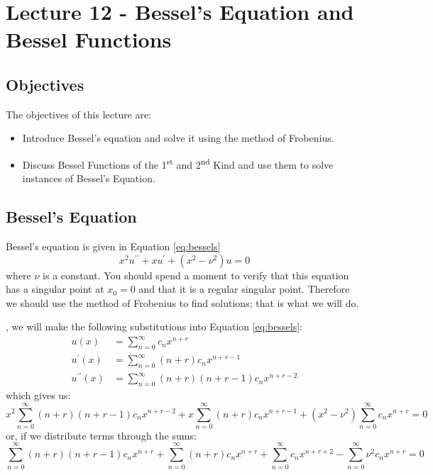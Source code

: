 \chapter{Lecture 12 - Bessel's Equation and Bessel Functions}
\label{ch:lec12}
\section{Objectives}
The objectives of this lecture are:
\begin{itemize}
\item Introduce Bessel's equation and solve it using the method of Frobenius.
\item Discuss Bessel Functions of the 1\textsuperscript{st} and 2\textsuperscript{nd} Kind and use them to solve instances of Bessel's Equation.
\end{itemize}

\section{Bessel's Equation}

Bessel's equation is given in Equation \ref{eq:bessels}
\begin{equation}
x^{2}u^{\prime \prime} + x u^{\prime} + \left(x^2 - \nu^2\right)u = 0
\label{eq:bessels}
\end{equation}
where $\nu$ is a constant.  You should spend a moment to verify that this equation has a singular point at $x_0 = 0$ and that it is a regular singular point.  Therefore we should use the method of Frobenius to find solutions; that is what we will do.

, we will make the following substitutions into Equation \ref{eq:bessels}:
\begin{align*}
u(x) &= \sum\limits_{n=0}^{\infty}c_n x^{n+r} \\
u^{\prime}(x) &= \sum\limits_{n=0}^{\infty} (n+r)c_nx^{n+r-1} \\
u^{\prime \prime}(x) &= \sum\limits_{n=0}^{\infty}(n+r)(n+r-1)c_nx^{n+r-2}
\end{align*}
which gives us:
\begin{equation*}
x^2\sum\limits_{n=0}^{\infty}(n+r)(n+r-1)c_nx^{n+r-2} + x\sum\limits_{n=0}^{\infty}(n+r)c_nx^{n+r-1} + \left(x^2-\nu^2 \right)\sum\limits_{n=0}^{\infty}c_nx^{n+r} = 0 
\end{equation*}
\noindent or, if we distribute terms through the sums:
\begin{equation*}
\sum\limits_{n=0}^{\infty}(n+r)(n+r-1)c_nx^{n+r} + \sum\limits_{n=0}^{\infty}(n+r)c_nx^{n+r} + \sum\limits_{n=0}^{\infty}c_nx^{n+r+2} - \sum\limits_{n=0}^{\infty}\nu^2c_nx^{n+r} = 0 
\end{equation*}

